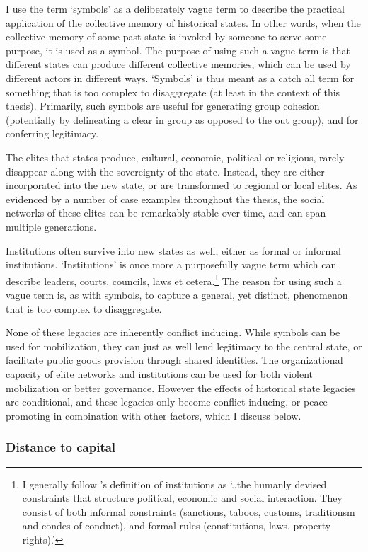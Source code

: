 I use the term `symbols' as a deliberately vague term to describe the practical
application of the collective memory of historical states. In other words, when
the collective memory of some past state is invoked by someone to serve some
purpose, it is used as a symbol. The purpose of using such a vague term is that
different states can produce different collective memories, which can be used by
different actors in different ways. `Symbols' is thus meant as a catch all term
for something that is too complex to disaggregate (at least in the context of
this thesis). Primarily, such symbols are useful for generating group cohesion
(potentially by delineating a clear in group as opposed to the out group), and
for conferring legitimacy.

The elites that states produce, cultural, economic, political or religious,
rarely disappear along with the sovereignty of the state. Instead, they are
either incorporated into the new state, or are transformed to regional or
local elites. As evidenced by a number of case examples throughout the thesis,
the social networks of these elites can be remarkably stable over time, and can
span multiple generations.

Institutions often survive into new states as well, either as formal or informal
institutions. `Institutions' is once more a purposefully vague term which can
describe leaders, courts, councils, laws et cetera.\footnote{I generally follow
	\citet[97]{North_1991}'s definition of institutions as `..the humanly
	devised constraints that structure political, economic and social
interaction. They consist of both informal constraints (sanctions, taboos,
customs, traditionsm and condes of conduct), and formal rules (constitutions,
laws, property rights).'} The reason for using such a vague term is, as with
symbols, to capture a general, yet distinct, phenomenon that is too complex to
disaggregate.

None of these legacies are inherently conflict inducing. While symbols can be
used for mobilization, they can just as well lend legitimacy to the central
state, or facilitate public goods provision through shared identities. The
organizational capacity of elite networks and institutions can be used for both
violent mobilization or better governance. However the effects of historical
state legacies are conditional, and these legacies only become conflict
inducing, or peace promoting in combination with other factors, which I discuss
below.

\subsubsection{Distance to capital} \label{dtc}

